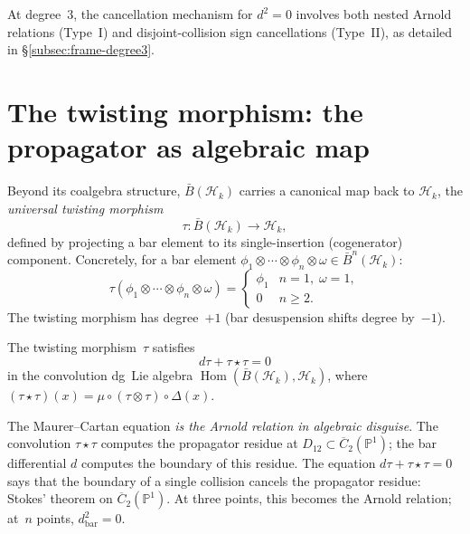 At degree~$3$, the cancellation mechanism for $d^2 = 0$ involves both
nested Arnold relations (Type~I) and disjoint-collision sign
cancellations (Type~II), as detailed in \S\ref{subsec:frame-degree3}.

\section{The twisting morphism: the propagator as algebraic map}
\label{sec:frame-twisting-morphism}

Beyond its coalgebra structure, $\bar{B}(\mathcal{H}_k)$ carries a
canonical map back to $\mathcal{H}_k$, the \emph{universal twisting
morphism}
\begin{equation}\label{eq:frame-twisting-morphism}
\tau\colon \bar{B}(\mathcal{H}_k) \longrightarrow \mathcal{H}_k,
\end{equation}
defined by projecting a bar element to its single-insertion
(cogenerator) component. Concretely, for a bar element
$\phi_1 \otimes \cdots \otimes \phi_n \otimes \omega
\in \bar{B}^n(\mathcal{H}_k)$:
\begin{equation}\label{eq:frame-tau-formula}
\tau(\phi_1 \otimes \cdots \otimes \phi_n \otimes \omega)
= \begin{cases}
 \phi_1 & n = 1,\;\omega = 1, \\[2pt]
 0 & n \geq 2.
\end{cases}
\end{equation}
The twisting morphism has degree~$+1$
(bar desuspension shifts degree by~$-1$).

\begin{proposition}
\label{prop:frame-twisting-MC}
The twisting morphism~$\tau$ satisfies
\begin{equation}\label{eq:frame-MC}
d\tau + \tau \star \tau = 0
\end{equation}
in the convolution dg~Lie algebra
$\operatorname{Hom}(\bar{B}(\mathcal{H}_k), \mathcal{H}_k)$,
where $(\tau \star \tau)(x)
= \mu \circ (\tau \otimes \tau) \circ \Delta(x)$.
\end{proposition}

The Maurer--Cartan equation \emph{is the Arnold relation in algebraic
disguise}. The convolution $\tau \star \tau$ computes the propagator
residue at $D_{12} \subset \overline{C}_2(\mathbb{P}^1)$; the bar
differential $d$ computes the boundary of this residue. The equation
$d\tau + \tau \star \tau = 0$ says that the boundary of a single
collision cancels the propagator residue: Stokes' theorem on
$\overline{C}_2(\mathbb{P}^1)$. At three points, this becomes the
Arnold relation; at~$n$ points, $d_{\mathrm{bar}}^2 = 0$.

